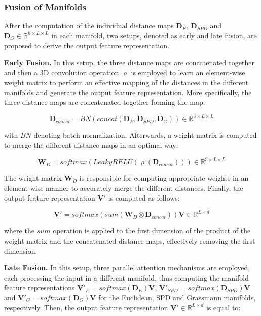 \documentclass[10pt,twocolumn,letterpaper]{article}
\begin{document}
\subsubsection{Fusion of Manifolds}

After the computation of the individual distance maps $\textbf{D}_{E}$, $\textbf{D}_{SPD}$ and $\textbf{D}_{G} \in \mathbb{R}^{h\times L \times L}$ in each manifold, two setups, denoted as early and late fusion, are proposed to derive the output feature representation.

\textbf{Early Fusion.} In this setup, the three distance maps are concatenated together and then a 3D convolution operation $\varrho$ is employed to learn an element-wise weight matrix to perform an effective mapping of the distances in the different manifolds and generate the output feature representation. More specifically, the three distance maps are concatenated together forming the map:

\begin{equation}
\label{eq:map_concat}
   \textbf{D}_{concat} =  BN(concat(\textbf{D}_{E}, \textbf{D}_{SPD}, \textbf{D}_{G})) \in \mathbb{R}^{3 \times L \times L}
\end{equation}

with $BN$ denoting batch normalization. Afterwards, a weight matrix is computed to merge the different distance maps in an optimal way:

\begin{equation}
\label{eq:weight}
   \textbf{W}_D =  softmax(LeakyRELU(\varrho(\textbf{D}_{concat}))) \in \mathbb{R}^{3 \times L \times L}
\end{equation}

The weight matrix $\textbf{W}_D$ is responsible for computing appropriate weights in an element-wise manner to accurately merge the different distances. Finally, the output feature representation $\textbf{V}'$ is computed as follows:

\begin{equation}
\label{eq:early_fusion}
   \textbf{V}' =  softmax(sum(\textbf{W}_D \otimes \textbf{D}_{concat}))\textbf{V} \in \mathbb{R}^{L \times d}
\end{equation}

where the $sum$ operation is applied to the first dimension of the product of the weight matrix and the concatenated distance maps, effectively removing the first dimension.

\textbf{Late Fusion.} In this setup, three parallel attention mechanisms are employed, each processing the input in a different manifold, thus computing the manifold feature representations $\textbf{V}'_E=softmax(\textbf{D}_E)\textbf{V}$, $\textbf{V}'_{SPD}=softmax(\textbf{D}_{SPD})\textbf{V}$ and $\textbf{V}'_G=softmax(\textbf{D}_G)\textbf{V}$ for the Euclidean, SPD and Grassmann manifolds, respectively. Then, the output feature representation $\textbf{V}' \in \mathbb{R}^{L\times d}$ is equal to:
\end{document}
